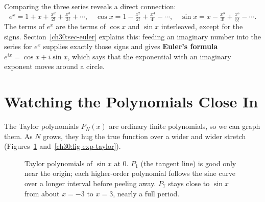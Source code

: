 \begin{connectionbox}
Comparing the three series reveals a direct connection:
\[
  e^x = 1 + x + \tfrac{x^2}{2!} + \tfrac{x^3}{3!} + \cdots,\quad
  \cos x = 1 - \tfrac{x^2}{2!} + \tfrac{x^4}{4!} - \cdots,\quad
  \sin x = x - \tfrac{x^3}{3!} + \tfrac{x^5}{5!} - \cdots.
\]
The terms of $e^x$ are the terms of $\cos x$ and $\sin x$ interleaved, except for the signs. Section~\ref{ch30:sec-euler} explains this: feeding an imaginary number into the series for $e^x$ supplies exactly those signs and gives \textbf{Euler's formula} $e^{ix} = \cos x + i\sin x$, which says that the exponential with an imaginary exponent moves around a circle.
\end{connectionbox}

\section{Watching the Polynomials Close In}
\label{ch30:sec-watching}

The Taylor polynomials $P_N(x)$ are ordinary finite polynomials, so we can graph them. As $N$ grows, they hug the true function over a wider and wider stretch (Figures~\ref{ch30:fig-sin-taylor} and~\ref{ch30:fig-exp-taylor}).

\begin{figure}[H]
\centering
{}
\caption{Taylor polynomials of $\sin x$ at $0$. $P_1$ (the tangent line) is good only near the origin; each higher-order polynomial follows the sine curve over a longer interval before peeling away. $P_7$ stays close to $\sin x$ from about $x=-3$ to $x=3$, nearly a full period.}
\label{ch30:fig-sin-taylor}
\end{figure}

